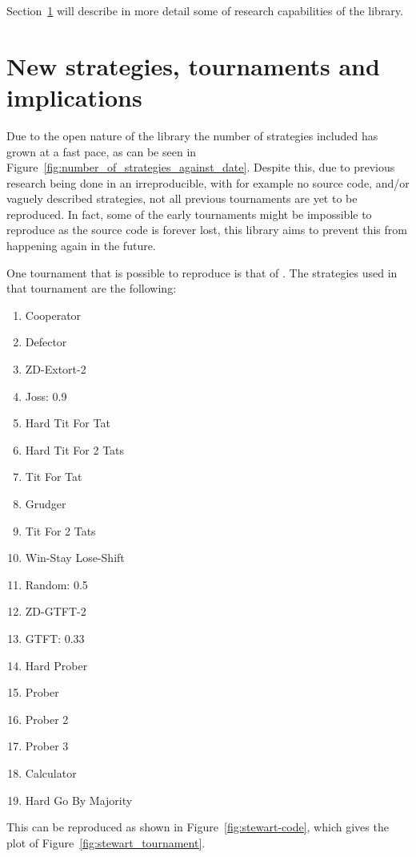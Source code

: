 \documentclass{article}
\begin{document}
Section~\ref{sec:new-strategies-and-implications} will describe in more detail
some of research capabilities of the library.

\section{New strategies, tournaments and implications}\label{sec:new-strategies-and-implications}

Due to the open nature of the library the number of strategies included has
grown at a fast pace, as can be seen in
Figure~\ref{fig:number_of_strategies_against_date}. Despite this, due to
previous research being done in an irreproducible, with for example no
source code, and/or vaguely described strategies, not all previous tournaments
are yet to be reproduced. In fact, some of the early tournaments might be
impossible to reproduce as the source code is forever lost, this library aims to
prevent this from happening again in the future.

One tournament that is possible to reproduce is that of
\cite{Stewart2012}. The strategies used in that tournament are the following:

\begin{enumerate}
    \item Cooperator
    \item Defector
    \item ZD-Extort-2
    \item Joss: 0.9
    \item Hard Tit For Tat
    \item Hard Tit For 2 Tats
    \item Tit For Tat
    \item Grudger
    \item Tit For 2 Tats
    \item Win-Stay Lose-Shift
    \item Random: 0.5
    \item ZD-GTFT-2
    \item GTFT: 0.33
    \item Hard Prober
    \item Prober
    \item Prober 2
    \item Prober 3
    \item Calculator
    \item Hard Go By Majority
\end{enumerate}

This can be reproduced as shown in Figure~\ref{fig:stewart-code}, which gives
the plot of Figure~\ref{fig:stewart_tournament}.
\end{document}
